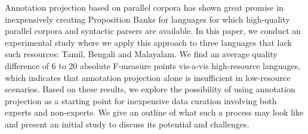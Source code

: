 Annotation projection based on parallel corpora has shown great promise in inexpensively creating Proposition Banks for languages for which high-quality parallel corpora and syntactic parsers are available. In this paper, we conduct an experimental study where we apply this approach to three languages that lack such resources: Tamil, Bengali and Malayalam. We find an average quality difference of 6 to 20 absolute F-measure points vis-a-vis high-resource languages, which indicates that annotation projection alone is insufficient in low-resource scenarios. Based on these results, we explore the possibility of using annotation projection as a starting point for inexpensive data curation involving both experts and non-experts. We give an outline of what such a process may look like and present an initial study to discuss its potential and challenges.
